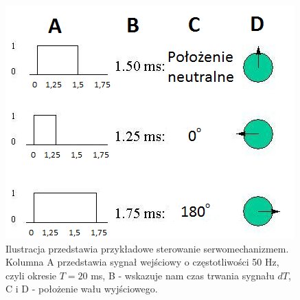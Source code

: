 \begin{figure}[H]
    \begin{center}
      \includegraphics[scale=0.8]{imgs/ster_serw.png}
 	\caption[Sterowanie serwomechanizmem.]{\small{Ilustracja przedstawia przykładowe sterowanie serwomechanizmem. Kolumna A przedstawia sygnał wejściowy o częstotliwości 50 Hz, czyli okresie $T=20$ ms, B - wskazuje nam czas trwania sygnału $dT$, C i D - położenie wału wyjściowego.}\footnotemark}
	\label{serwomechanizm_sterowanie}
    \end{center}
  \end{figure}  
  	  
